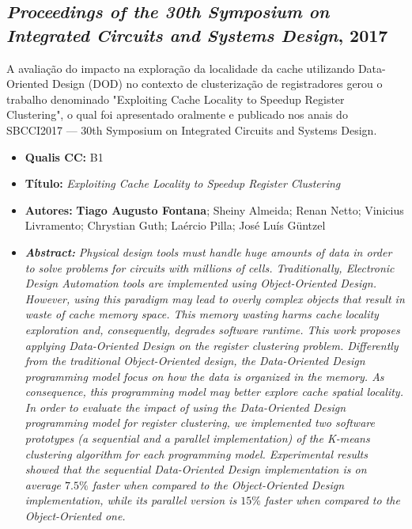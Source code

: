 \subsection{\textit{Proceedings of the 30th Symposium on Integrated Circuits and Systems Design}, 2017}

A avaliação do impacto na exploração da localidade da cache utilizando Data-Oriented Design (DOD) no contexto de clusterização de registradores gerou o trabalho denominado "Exploiting Cache Locality to Speedup Register Clustering", o qual foi apresentado oralmente e publicado nos anais do SBCCI2017 --- 30th Symposium on Integrated Circuits and Systems Design.

\begin{itemize}
\item \textbf{Qualis CC:} B1
\item \textbf{Título:} \textit{Exploiting Cache Locality to Speedup Register Clustering}
\item \textbf{Autores:}  \textbf{Tiago Augusto Fontana}; Sheiny Almeida; Renan Netto; Vinicius Livramento; Chrystian Guth;  Laércio Pilla; José Luís Güntzel
\item \textbf{\textit{Abstract:}} \emph{Physical design tools must handle huge amounts of data in order to solve problems for circuits with millions of cells. Traditionally, Electronic Design Automation tools are implemented using Object-Oriented Design. However, using this paradigm may lead to overly complex objects that result in waste of cache memory space. This memory wasting harms cache locality exploration and, consequently, degrades software runtime. This work proposes applying Data-Oriented Design on the register clustering problem. Differently from the traditional Object-Oriented design, the Data-Oriented Design programming model focus on how the data is organized in the memory. As consequence, this programming model may better explore cache spatial locality. In order to evaluate the impact of using the Data-Oriented Design programming model for register clustering, we implemented two software prototypes (a sequential and a parallel implementation) of the K-means clustering algorithm for each programming model. Experimental results showed that the sequential Data-Oriented Design implementation is on average $7.5\%$ faster when compared to the Object-Oriented Design implementation, while its parallel version is $15\%$ faster when compared to the Object-Oriented one.}
\end{itemize}

